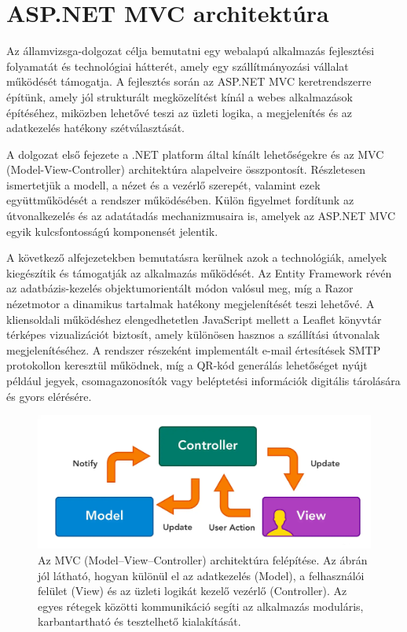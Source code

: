 
\section{ASP.NET MVC architektúra}

\indent Az államvizsga-dolgozat célja bemutatni egy webalapú alkalmazás fejlesztési folyamatát és technológiai hátterét, amely egy szállítmányozási vállalat működését támogatja. A fejlesztés során az ASP.NET MVC keretrendszerre építünk, amely jól strukturált megközelítést kínál a webes alkalmazások építéséhez, miközben lehetővé teszi az üzleti logika, a megjelenítés és az adatkezelés hatékony szétválasztását.

A dolgozat első fejezete a .NET platform által kínált lehetőségekre és az MVC (Model-View-Controller) architektúra alapelveire összpontosít. Részletesen ismertetjük a modell, a nézet és a vezérlő szerepét, valamint ezek együttműködését a rendszer működésében. Külön figyelmet fordítunk az útvonalkezelés és az adatátadás mechanizmusaira is, amelyek az ASP.NET MVC egyik kulcsfontosságú komponensét jelentik.

A következő alfejezetekben bemutatásra kerülnek azok a technológiák, amelyek kiegészítik és támogatják az alkalmazás működését. Az Entity Framework révén az adatbázis-kezelés objektumorientált módon valósul meg, míg a Razor nézetmotor a dinamikus tartalmak hatékony megjelenítését teszi lehetővé. A kliensoldali működéshez elengedhetetlen JavaScript mellett a Leaflet könyvtár térképes vizualizációt biztosít, amely különösen hasznos a szállítási útvonalak megjelenítéséhez. A rendszer részeként implementált e-mail értesítések SMTP protokollon keresztül működnek, míg a QR-kód generálás lehetőséget nyújt például jegyek, csomagazonosítók vagy beléptetési információk digitális tárolására és gyors elérésére.

\begin{figure}[H]
    \centering
    \includegraphics[width=1\textwidth]{Szakdolgozat/Mellekletek/MVCDiagramm.png}
    \caption{Az MVC (Model–View–Controller) architektúra felépítése. Az ábrán jól látható, hogyan különül el az adatkezelés (Model), a felhasználói felület (View) és az üzleti logikát kezelő vezérlő (Controller). Az egyes rétegek közötti kommunikáció segíti az alkalmazás moduláris, karbantartható és tesztelhető kialakítását.}
    \label{fig:er-diagram}
\end{figure}


